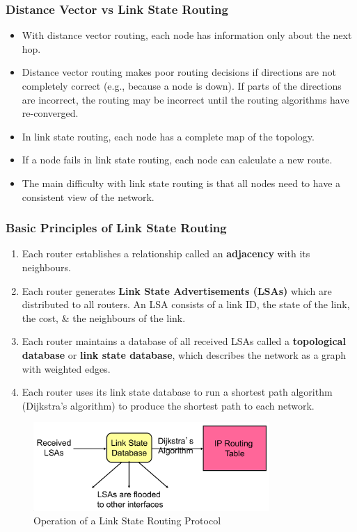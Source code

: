 \documentclass[a4paper,11pt]{article}
\begin{document}
\subsubsection{Distance Vector vs Link State Routing}
\begin{itemize}
    \item   With distance vector routing, each node has information only about the next hop.
    \item   Distance vector routing makes poor routing decisions if directions are not completely correct (e.g., 
            because a node is down).
            If parts of the directions are incorrect, the routing may be incorrect until the routing algorithms 
            have re-converged.
    \item   In link state routing, each node has a complete map of the topology.
    \item   If a node fails in link state routing, each node can calculate a new route. 
    \item   The main difficulty with link state routing is that all nodes need to have a consistent view of the 
            network.
\end{itemize}

\subsubsection{Basic Principles of Link State Routing}
\begin{enumerate}
    \item   Each router establishes a relationship called an \textbf{adjacency} with its neighbours.
    \item   Each router generates \textbf{Link State Advertisements (LSAs)} which are distributed to all routers.
            An LSA consists of a link ID, the state of the link, the cost, \& the neighbours of the link.
    \item   Each router maintains a database of all received LSAs called a \textbf{topological database} or 
            \textbf{link state database}, which describes the network as a graph with weighted edges.
    \item   Each router uses its link state database to run a shortest path algorithm (Dijkstra's algorithm) to 
            produce the shortest path to each network.
\end{enumerate}

\begin{figure}[H]
    \centering
    \includegraphics[width=0.8\textwidth]{./images/lsr_protocol.png}
    \caption{Operation of a Link State Routing Protocol}
\end{figure}
\end{document}
